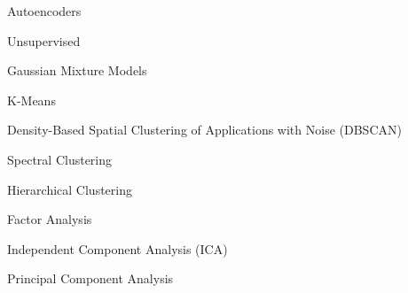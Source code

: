 \documentclass[11pt]{article}
\begin{document}
\begin{enumerate}
\begin{item}
\begin{enumerate}
\begin{item}
\begin{enumerate}
\begin{item}
\begin{enumerate}
                      \begin{item}
                        Autoencoders
                      \end{item}

                  \end{enumerate}

                \end{item}

            \end{enumerate}


          \end{item}

          \begin{item}

            Unsupervised

            \begin{enumerate}

                \begin{item}
                  Gaussian Mixture Models
                \end{item}

                \begin{item}
                  K-Means
                \end{item}

                \begin{item}
                  Density-Based Spatial Clustering of Applications with Noise
                  (DBSCAN)
                \end{item}

                \begin{item}
                  Spectral Clustering
                \end{item}

                \begin{item}
                  Hierarchical Clustering
                \end{item}

                \begin{item}
                  Factor Analysis
                \end{item}

                \begin{item}
                  Independent Component Analysis (ICA)
                \end{item}

                \begin{item}
                  Principal Component Analysis
                \end{item}


\end{enumerate}
\end{item}
\end{enumerate}
\end{item}
\end{enumerate}
\end{document}
